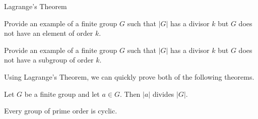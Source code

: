 \begin{section}{Lagrange's Theorem}
\begin{problem}
Provide an example of a finite group $G$ such that $|G|$ has a divisor $k$ but $G$ does not have an element of order $k$.
\end{problem}

\begin{problem}
Provide an example of a finite group $G$ such that $|G|$ has a divisor $k$ but $G$ does not have a subgroup of order $k$.
\end{problem}

%

Using Lagrange's Theorem, we can quickly prove both of the following theorems.

\begin{theorem}\label{thm:order_element_divides_group_order}
Let $G$ be a finite group and let $a\in G$.  Then $|a|$ divides $|G|$.
\end{theorem}

\begin{theorem}
Every group of prime order is cyclic.
\end{theorem}


\end{section}
